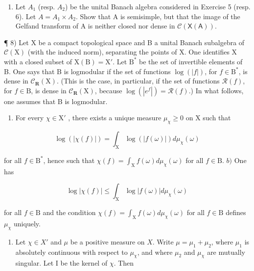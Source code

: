 \begin{enumerate}
\def\labelenumi{\arabic{enumi})}
\setcounter{enumi}{6}
\tightlist
\item
  Let \(A_{1}\) (resp. \(A_{2}\)) be the unital Banach algebra considered in Exercise 5 (resp. 6). Let \(A = A_{1} \times A_{2}\). Show that A is semisimple, but that the image of the Gelfand transform of A is neither closed nor dense in \(\mathcal{C}(\mathsf{X}(\mathsf{A}))\).
\end{enumerate}

¶ 8) Let X be a compact topological space and B a unital Banach subalgebra of \(\mathcal{C}(\mathrm{X})\) (with the induced norm), separating the points of X. One identifies X with a closed subset of \(\mathrm{X(B)} = \mathrm{X}'\). Let \(\mathrm{B}^*\) be the set of invertible elements of B. One says that B is logmodular if the set of functions \(\log(|f|)\), for \(f \in \mathrm{B}^*\), is dense in \(\mathcal{C}_{\mathbf{R}}(\mathrm{X})\). (This is the case, in particular, if the set of functions \(\mathcal{R}(f)\), for \(f \in \mathrm{B}\), is dense in \(\mathcal{C}_{\mathbf{R}}(\mathrm{X})\), because \(\log(|e^f|) = \mathcal{R}(f)\).) In what follows, one assumes that B is logmodular.

\begin{enumerate}
\def\labelenumi{\alph{enumi})}
\tightlist
\item
  For every \(\chi \in \mathrm{X}'\) , there exists a unique measure \(\mu_{\chi} \geqslant 0\) on X such that
\end{enumerate}

\[
\log (| \chi (f) |) = \int_ {\mathrm{X}} \log (| f (\omega) |) d \mu_ {\chi} (\omega)
\]

for all \(f \in \mathrm{B}^*\), hence such that \(\chi(f) = \int_{\mathrm{X}} f(\omega) d\mu_{\chi}(\omega)\) for all \(f \in \mathrm{B}\). \(b)\) One has

\[
\log | \chi (f) | \leqslant \int_ {\mathrm{X}} \log | f (\omega) | d \mu_ {\chi} (\omega)
\]

for all \(f \in \mathrm{B}\) and the condition \(\chi(f) = \int_{\mathrm{X}} f(\omega) d\mu_{\chi}(\omega)\) for all \(f \in \mathrm{B}\) defines \(\mu_{\chi}\) uniquely.

\begin{enumerate}
\def\labelenumi{\alph{enumi})}
\setcounter{enumi}{2}
\tightlist
\item
  Let \(\chi \in X'\) and \(\mu\) be a positive measure on \(X\). Write \(\mu = \mu_1 + \mu_2\), where \(\mu_1\) is absolutely continuous with respect to \(\mu_{\chi}\), and where \(\mu_2\) and \(\mu_{\chi}\) are mutually singular. Let I be the kernel of \(\chi\). Then
\end{enumerate}

